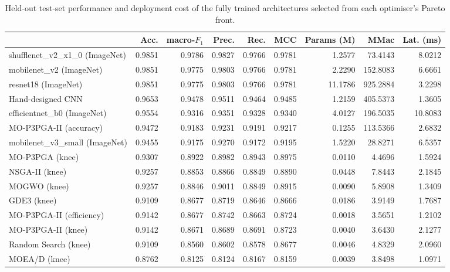 \begin{table}[htbp]
\centering
\caption{Held-out test-set performance and deployment cost of the fully trained architectures selected from each optimiser's Pareto front.}
\label{tab:testresults}
\footnotesize
\begin{tabular}{lrrrrrrrr}
\toprule
 & Acc. & macro-$F_1$ & Prec. & Rec. & MCC & Params (M) & MMac & Lat. (ms) \\
\midrule
shufflenet\_v2\_x1\_0 (ImageNet) & 0.9851 & 0.9786 & 0.9827 & 0.9766 & 0.9781 & 1.2577 & 73.4143 & 8.0212 \\
mobilenet\_v2 (ImageNet) & 0.9851 & 0.9775 & 0.9803 & 0.9766 & 0.9781 & 2.2290 & 152.8083 & 6.6661 \\
resnet18 (ImageNet) & 0.9851 & 0.9775 & 0.9803 & 0.9766 & 0.9781 & 11.1786 & 925.2884 & 3.2298 \\
Hand-designed CNN & 0.9653 & 0.9478 & 0.9511 & 0.9464 & 0.9485 & 1.2159 & 405.5373 & 1.3605 \\
efficientnet\_b0 (ImageNet) & 0.9554 & 0.9316 & 0.9351 & 0.9328 & 0.9340 & 4.0127 & 196.5035 & 10.8083 \\
MO-P3PGA-II (accuracy) & 0.9472 & 0.9183 & 0.9231 & 0.9191 & 0.9217 & 0.1255 & 113.5366 & 2.6832 \\
mobilenet\_v3\_small (ImageNet) & 0.9455 & 0.9175 & 0.9270 & 0.9172 & 0.9195 & 1.5220 & 28.8271 & 6.5357 \\
MO-P3PGA (knee) & 0.9307 & 0.8922 & 0.8982 & 0.8943 & 0.8975 & 0.0110 & 4.4696 & 1.5924 \\
NSGA-II (knee) & 0.9257 & 0.8853 & 0.8866 & 0.8849 & 0.8890 & 0.0448 & 7.8443 & 2.1845 \\
MOGWO (knee) & 0.9257 & 0.8846 & 0.9011 & 0.8849 & 0.8915 & 0.0090 & 5.8908 & 1.3409 \\
GDE3 (knee) & 0.9109 & 0.8677 & 0.8719 & 0.8646 & 0.8666 & 0.0186 & 3.9149 & 1.7687 \\
MO-P3PGA-II (efficiency) & 0.9142 & 0.8677 & 0.8742 & 0.8663 & 0.8724 & 0.0018 & 3.5651 & 1.2102 \\
MO-P3PGA-II (knee) & 0.9142 & 0.8671 & 0.8689 & 0.8691 & 0.8723 & 0.0040 & 3.6430 & 2.1277 \\
Random Search (knee) & 0.9109 & 0.8560 & 0.8602 & 0.8578 & 0.8677 & 0.0046 & 4.8329 & 2.0960 \\
MOEA/D (knee) & 0.8762 & 0.8125 & 0.8124 & 0.8167 & 0.8159 & 0.0039 & 3.8498 & 1.0971 \\
\bottomrule
\end{tabular}
\end{table}
